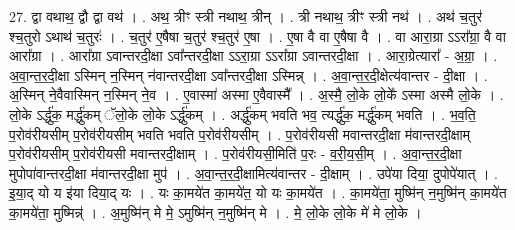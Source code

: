 \documentclass[17pt]{extarticle}
\begin{document}
27. द्वा वथाथ॒ द्वौ द्वा वथ॑ । . अथ॒ त्रीꣳ स्त्री नथाथ॒ त्रीन् । . त्री नथाथ॒ त्रीꣳ स्त्री नथ॑ । . अथ॑ च॒तुर॑ श्च॒तुरो ऽथाथ॑ च॒तुरः॑ । . च॒तुर॑ ए॒षैषा च॒तुर॑ श्च॒तुर॑ ए॒षा । . ए॒षा वै वा ए॒षैषा वै । . वा आरा॒ग्रा ऽऽरा᳚ग्रा॒ वै वा आरा᳚ग्रा । . आरा᳚ग्रा ऽवान्तरदी॒क्षा ऽवा᳚न्तरदी॒क्षा ऽऽरा॒ग्रा ऽऽरा᳚ग्रा ऽवान्तरदी॒क्षा । . आरा॒ग्रेत्यारा᳚ - अ॒ग्रा॒ । . अ॒वा॒न्त॒र॒दी॒क्षा ऽस्मिन् न॒स्मिन् न॑वान्तरदी॒क्षा ऽवा᳚न्तरदी॒क्षा ऽस्मिन्न् । . अ॒वा॒न्त॒र॒दी॒क्षेत्य॑वान्तर - दी॒क्षा । . अ॒स्मिन् ने॒वैवास्मिन् न॒स्मिन् ने॒व । . ए॒वास्मा॑ अस्मा ए॒वैवास्मै᳚ । . अ॒स्मै॒ लो॒के लो॒के᳚ ऽस्मा अस्मै लो॒के । . लो॒के ऽर्द्धु॑क॒ मर्द्धु॑कम् ॅलो॒के लो॒के ऽर्द्धु॑कम् । . अर्द्धु॑कम् भवति भव॒ त्यर्द्धु॑क॒ मर्द्धु॑कम् भवति । . भ॒व॒ति॒ प॒रोव॑रीयसीम् प॒रोव॑रीयसीम् भवति भवति प॒रोव॑रीयसीम् । . प॒रोव॑रीयसी मवान्तरदी॒क्षा म॑वान्तरदी॒क्षाम् प॒रोव॑रीयसीम् प॒रोव॑रीयसी मवान्तरदी॒क्षाम् । . प॒रोव॑रीयसी॒मिति॑ प॒रः - व॒री॒य॒सी॒म् । . अ॒वा॒न्त॒र॒दी॒क्षा मुपोपा॑वान्तरदी॒क्षा म॑वान्तरदी॒क्षा मुप॑ । . अ॒वा॒न्त॒र॒दी॒क्षामित्य॑वान्तर - दी॒क्षाम् । . उपे॑या दिया॒ दुपोपे॑यात् । . इ॒या॒द् यो य इ॑या दिया॒द् यः । . यः का॒मये॑त का॒मये॑त॒ यो यः का॒मये॑त । . का॒मये॑ता॒ मुष्मि॑न् न॒मुष्मि॑न् का॒मये॑त का॒मये॑ता॒ मुष्मिन्न्॑ । . अ॒मुष्मि॑न् मे मे॒ ऽमुष्मि॑न् न॒मुष्मि॑न् मे । . मे॒ लो॒के लो॒के मे॑ मे लो॒के । \newline
\end{document}
